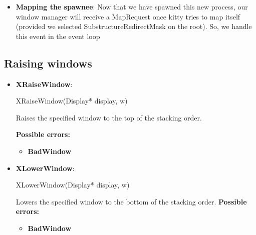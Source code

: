 \documentclass{report}
\begin{document}
\begin{itemize}
\begin{bashcode}
{                // The second kitty is argv[0], which is the name of the program
                execlp("kitty", "kitty", (char*)NULL);


                // Command not found or kitty failed to execute
                _exit(127);
            }
            \end{bashcode}
        \item \textbf{Mapping the spawnee}: Now that we have spawned this new process, our window manager will receive a MapRequest once kitty tries to map itself (provided we selected SubstructureRedirectMask on the root). So, we handle this event in the event loop

    \end{itemize}

    \pagebreak 
    \subsection{Raising windows}
    \begin{itemize}
        \item \textbf{XRaiseWindow}:
            \bigbreak \noindent 
            \begin{cppcode}
                XRaiseWindow(Display* display, w)
            \end{cppcode}
            \bigbreak \noindent
            Raises the specified window to the top of the stacking order.

            \bigbreak \noindent
            \textbf{Possible errors:}
            \begin{itemize}
                \item \textbf{BadWindow}
            \end{itemize}

        \item \textbf{XLowerWindow}:
            \bigbreak \noindent 
            \begin{cppcode}
                XLowerWindow(Display* display, w)
            \end{cppcode}
            \bigbreak \noindent
            Lowers the specified window to the bottom of the stacking order.
            \bigbreak \noindent
            \textbf{Possible errors:}
            \begin{itemize}
                \item \textbf{BadWindow}
            \end{itemize}


    \end{itemize}
\end{document}
